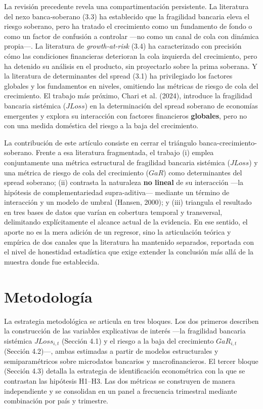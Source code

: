 \documentclass[5p,times,twocolumn,authoryear]{elsarticle}
\begin{document}
La revisión precedente revela una compartimentación persistente. La literatura del nexo banca-soberano (3.3) ha establecido que la fragilidad bancaria eleva el riesgo soberano, pero ha tratado el crecimiento como un fundamento de fondo o como un factor de confusión a controlar —no como un canal de cola con dinámica propia—. La literatura de \textit{growth-at-risk} (3.4) ha caracterizado con precisión cómo las condiciones financieras deterioran la cola izquierda del crecimiento, pero ha detenido su análisis en el producto, sin proyectarlo sobre la prima soberana. Y la literatura de determinantes del spread (3.1) ha privilegiado los factores globales y los fundamentos en niveles, omitiendo las métricas de riesgo de cola del crecimiento. El trabajo más próximo, Chari et al. (2024), introduce la fragilidad bancaria sistémica ($JLoss$) en la determinación del spread soberano de economías emergentes y explora su interacción con factores financieros \textbf{globales}, pero no con una medida doméstica del riesgo a la baja del crecimiento.

La contribución de este artículo consiste en cerrar el triángulo banca-crecimiento-soberano. Frente a esa literatura fragmentada, el trabajo (i) emplea conjuntamente una métrica estructural de fragilidad bancaria sistémica ($JLoss$) y una métrica de riesgo de cola del crecimiento ($GaR$) como determinantes del spread soberano; (ii) contrasta la naturaleza \textbf{no lineal} de su interacción —la hipótesis de complementariedad supra-aditiva— mediante un término de interacción y un modelo de umbral (Hansen, 2000); y (iii) triangula el resultado en tres bases de datos que varían en cobertura temporal y transversal, delimitando explícitamente el alcance actual de la evidencia. En ese sentido, el aporte no es la mera adición de un regresor, sino la articulación teórica y empírica de dos canales que la literatura ha mantenido separados, reportada con el nivel de honestidad estadística que exige extender la conclusión más allá de la muestra donde fue establecida.


\section{Metodología}

La estrategia metodológica se articula en tres bloques. Los dos primeros describen la construcción de las variables explicativas de interés —la fragilidad bancaria sistémica $JLoss_{i,t}$ (Sección 4.1) y el riesgo a la baja del crecimiento $GaR_{i,t}$ (Sección 4.2)—, ambas estimadas a partir de modelos estructurales y semiparamétricos sobre microdatos bancarios y macrofinancieros. El tercer bloque (Sección 4.3) detalla la estrategia de identificación econométrica con la que se contrastan las hipótesis H1–H3. Las dos métricas se construyen de manera independiente y se consolidan en un panel a frecuencia trimestral mediante combinación por país y trimestre.
\end{document}
